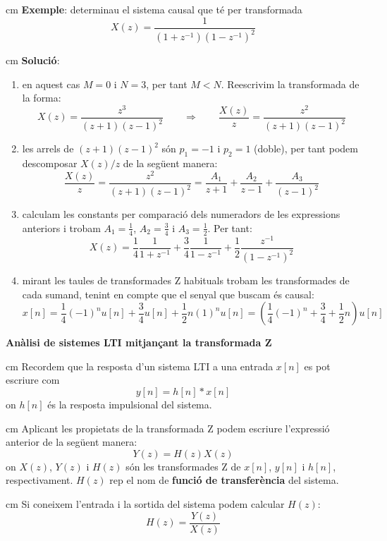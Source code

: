 \documentclass{article}
\begin{document}
\begin{enumerate}
\begin{enumerate}
\end{enumerate}

\end{enumerate}


 cm
\noindent
\textbf{Exemple}: determinau el sistema causal que t\'e per transformada 
\[
X(z)=\frac{1}{(1+z^{-1})(1-z^{-1})^2}
\]

 cm
\noindent
\textbf{Soluci\'o}:
\begin{enumerate}
\item en aquest cas $M=0$ i $N=3$, per tant $M < N$. Reescrivim la transformada de
la forma:
\[
X(z)=\frac{z^3}{(z+1)(z-1)^2} \qquad \Longrightarrow \qquad \frac{X(z)}{z}=\frac{z^2}{(z+1)(z-1)^2}
\]
\item les arrels de $(z+1)(z-1)^2$ s\'on $p_1=-1$ i $p_2=1$ (doble), per tant podem descomposar $X(z)/z$
de la seg\"uent manera:
\[
\frac{X(z)}{z}=\frac{z^2}{(z+1)(z-1)^2}=\frac{A_1}{z+1}+\frac{A_2}{z-1}+\frac{A_3}{(z-1)^2}
\]
\item calculam les constants per comparaci\'o dels numeradors de les expressions anteriors i trobam 
$A_1=\frac{1}{4}$, $A_2=\frac{3}{4}$ i $A_3=\frac{1}{2}$. Per tant:
\[
X(z)=\frac{1}{4} \frac{1}{1+z^{-1}} + \frac{3}{4} \frac{1}{1-z^{-1}} + \frac{1}{2} \frac{z^{-1}}{(1-z^{-1})^2} 
\]
\item mirant les taules de transformades Z habituals trobam les transformades de cada sumand, tenint
en compte que el senyal que buscam \'es causal:
\[
x[n]=\frac{1}{4} (-1)^nu[n] + \frac{3}{4} u[n] + \frac{1}{2} n (1)^n u[n] = 
\left( \frac{1}{4} (-1)^n + \frac{3}{4} + \frac{1}{2} n \right) u[n]
\]
\end{enumerate}

\vskip 1cm
\noindent
\textbf{An\`alisi de sistemes LTI mitjan\c{c}ant la transformada Z}

 cm
\noindent
Recordem que la resposta d'un sistema LTI a una entrada $x[n]$ es pot escriure com
\[
y[n]=h[n] * x[n]
\]
\noindent
on $h[n]$ \'es la resposta impulsional del sistema.

 cm
\noindent
Aplicant les propietats de la transformada Z podem escriure l'expressi\'o anterior
de la seg\"uent manera:
\[
Y(z)=H(z) X(z)
\]
\noindent
on $X(z)$, $Y(z)$ i $H(z)$ s\'on les transformades Z de $x[n]$, $y[n]$ i $h[n]$, respectivament.
$H(z)$ rep el nom de \textbf{funci\'o de transfer\`encia} del sistema.

 cm
\noindent
Si coneixem l'entrada i la sortida del sistema podem calcular $H(z)$:
\[
H(z)=\frac{Y(z)}{X(z)}
\]
\end{document}
